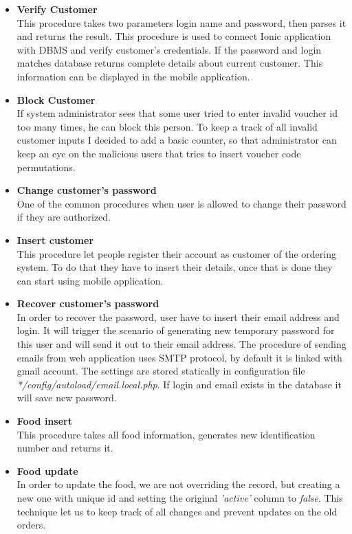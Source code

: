 \begin{itemize}
	

\item \textbf{Verify Customer}
\\
This procedure takes two parameters login name and password, then parses it and returns the result. This procedure is used to connect Ionic application with DBMS and verify customer's credentials. If the password and login matches database returns complete details about current customer. This information can be displayed in the mobile application.

\item \textbf{Block Customer} 
\\
If system administrator sees that some user tried to enter invalid voucher id too many times, he can block this person. To keep a track of all invalid customer inputs I decided to add a basic counter, so that administrator can keep an eye on the malicious users that tries to insert voucher code permutations.

\item \textbf{Change customer's password}
\\
One of the common procedures when user is allowed to change their password if they are authorized.

\item \textbf{Insert customer}
\\
This procedure let people register their account as customer of the ordering system. To do that they have to insert their details, once that is done they can start using mobile application.

\item \textbf{Recover customer's password}
\\
In order to recover the password, user have to insert their email address and login. It will trigger the scenario of generating new temporary password for this user and will send it out to their email address. The procedure of sending emails from web application uses SMTP protocol, by default it is linked with gmail account. The settings are stored statically in configuration file \textit{*/config/autoload/email.local.php}. If login and email exists in the database it will save new password.


\item \textbf{Food insert}
\\
This procedure takes all food information, generates new identification number and returns it.


\item \textbf{Food update}
\\
In order to update the food, we are not overriding the record, but creating a new one with unique id and setting the original \textit{'active'} column to \textit{false}. This technique let us to keep track of all changes and prevent updates on the old orders.



\end{itemize}

